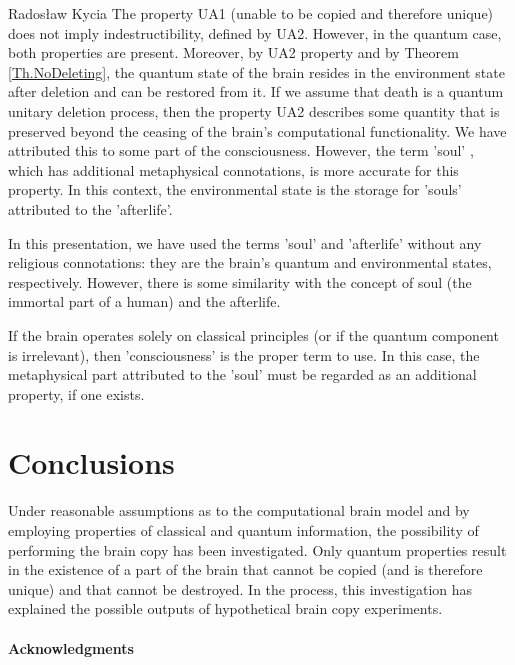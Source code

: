\begin{artengenv}{Radosław Kycia}
The property UA1 (unable to be copied and therefore unique) does not imply indestructibility, defined by UA2. However, in the quantum case, both properties are present. Moreover, by UA2 property and by Theorem \ref{Th.NoDeleting}, the quantum state of the brain resides in the environment state after deletion and can be restored from it. If we assume that death is a quantum unitary deletion process, then the property UA2 describes some quantity that is preserved beyond the ceasing of the brain's computational functionality. We have attributed this to some part of the consciousness. However, the term 'soul' \parencite{Soul}, which has additional metaphysical connotations, is more accurate for this property. In this context, the environmental state is the storage for 'souls' attributed to the 'afterlife'.

In this presentation, we have used the terms 'soul' and 'afterlife' without any religious connotations: they are the brain's quantum and environmental states, respectively. However, there is some similarity with the concept of soul (the immortal part of a human) and the afterlife. 


If the brain operates solely on classical principles (or if the quantum component is irrelevant), then 'consciousness' is the proper term to use. In this case, the metaphysical part attributed to the 'soul' must be regarded as an additional property, if one exists. 





\section{Conclusions}
Under reasonable assumptions as to the computational brain model and by employing properties of classical and quantum information, the possibility of performing the brain copy has been investigated. Only quantum properties result in the existence of a part of the brain that cannot be copied (and is therefore unique) and that cannot be destroyed. In the process, this investigation has explained the possible outputs of hypothetical brain copy experiments.


\paragraph{Acknowledgments}


\end{artengenv}
